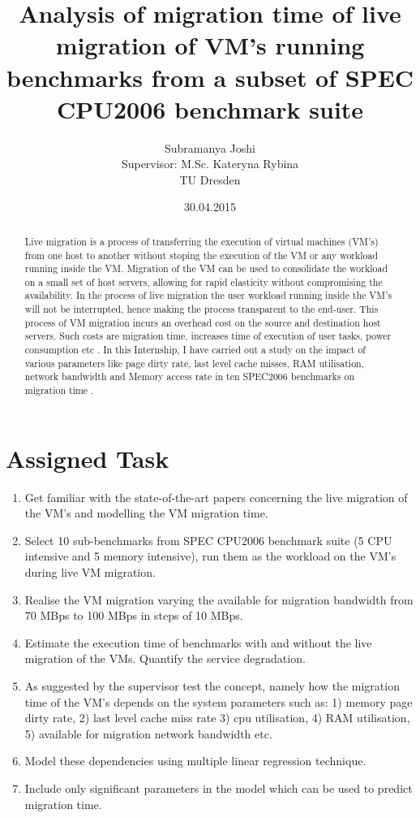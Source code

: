 \documentclass[a4paper,10pt,twoside]{article}
\title{Analysis of migration time of live migration of VM's running benchmarks from a subset of SPEC CPU2006 benchmark suite}
\author{Subramanya Joshi
\\ Supervisor: M.Sc. Kateryna Rybina \\
TU Dresden}
\date{30.04.2015}
\begin{document}
\maketitle

\begin{abstract}
Live migration \cite{clark2005live} is a process of transferring the execution of virtual machines (VM's) from one host to another without stoping the execution of the VM or any workload running inside the VM. Migration of the VM  can be used to consolidate the workload on a small set of host servers, allowing for rapid elasticity without compromising the availability. In the process of  live migration the user workload running inside the VM's will not be interrupted, hence making the process transparent to the end-user. This process of  VM migration incurs an overhead  cost on the source and destination host servers. Such costs are migration time, increases time of execution of user tasks, power consumption etc \cite{strunk2013does}. In this Internship, I have carried out a study on the impact of various parameters like page dirty rate, last level cache misses, RAM utilisation, network bandwidth and Memory access rate in ten SPEC2006 benchmarks on migration time \cite{rybina2014analysing}. 
\end{abstract}

\tableofcontents
\section{Assigned Task}
\begin{enumerate}
 \item Get familiar with the state-of-the-art papers concerning the live migration of the VM's and modelling the VM migration time.
 \item Select 10 sub-benchmarks from SPEC CPU2006 benchmark suite (5 CPU intensive and 5 memory intensive), run them as the workload on the VM's during live VM migration. 
 \item Realise the VM migration varying the available for migration bandwidth from 70 MBps to 100 MBps in steps of 10 MBps.
 \item Estimate the execution time of benchmarks with and without the live migration of the VMs. Quantify the service degradation.
 \item As suggested by the supervisor test the concept, namely how the migration time of the VM's depends on the system parameters such as: 1) memory page dirty rate, 2) last level cache miss rate 3) cpu utilisation, 4) RAM utilisation, 5) available for migration network bandwidth etc.
 \item Model these dependencies using multiple linear regression technique.
 \item Include only significant parameters in the model which can be used to predict migration time.
\end{enumerate}
\end{document}
